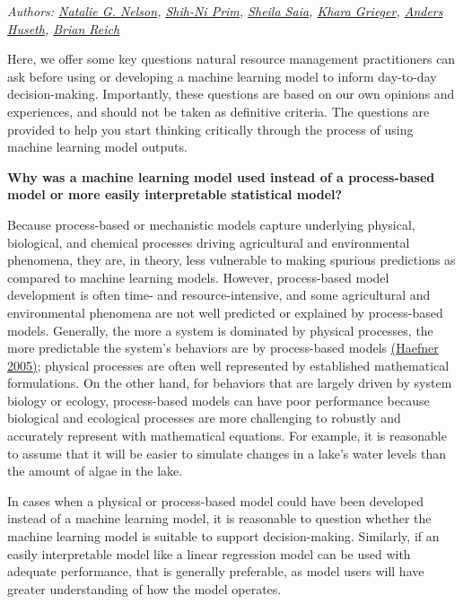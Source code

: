 \documentclass[
]{book}
\begin{document}
\emph{Authors: \href{https://bae.ncsu.edu/people/nnelson4/}{Natalie G. Nelson}, \href{https://www.linkedin.com/in/shih-ni-prim-14033336/}{Shih-Ni Prim}, \href{https://sheilasaia.rbind.io/}{Sheila Saia}, \href{https://cals.ncsu.edu/applied-ecology/people/kdgriege/}{Khara Grieger}, \href{https://cals.ncsu.edu/entomology-and-plant-pathology/people/ashuseth/}{Anders Huseth}, \href{https://statistics.sciences.ncsu.edu/people/bjreich/}{Brian Reich}}

Here, we offer some key questions natural resource management practitioners can ask before using or developing a machine learning model to inform day-to-day decision-making. Importantly, these questions are based on our own opinions and experiences, and should not be taken as definitive criteria. The questions are provided to help you start thinking critically through the process of using machine learning model outputs.

\textbf{Why was a machine learning model used instead of a process-based model or more easily interpretable statistical model?}

Because process-based or mechanistic models capture underlying physical, biological, and chemical processes driving agricultural and environmental phenomena, they are, in theory, less vulnerable to making spurious predictions as compared to machine learning models. However, process-based model development is often time- and resource-intensive, and some agricultural and environmental phenomena are not well predicted or explained by process-based models. Generally, the more a system is dominated by physical processes, the more predictable the system's behaviors are by process-based models \href{https://link.springer.com/book/10.1007/b106568}{(Haefner 2005)}; physical processes are often well represented by established mathematical formulations. On the other hand, for behaviors that are largely driven by system biology or ecology, process-based models can have poor performance because biological and ecological processes are more challenging to robustly and accurately represent with mathematical equations. For example, it is reasonable to assume that it will be easier to simulate changes in a lake's water levels than the amount of algae in the lake.

In cases when a physical or process-based model could have been developed instead of a machine learning model, it is reasonable to question whether the machine learning model is suitable to support decision-making. Similarly, if an easily interpretable model like a linear regression model can be used with adequate performance, that is generally preferable, as model users will have greater understanding of how the model operates.
\end{document}
